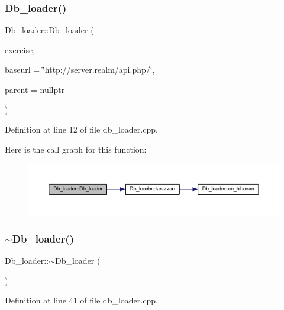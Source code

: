 \subsubsection{\texorpdfstring{Db\+\_\+loader()}{Db\_loader()}}
{\footnotesize\ttfamily Db\+\_\+loader\+::\+Db\+\_\+loader (\begin{DoxyParamCaption}\item[{Q\+Standard\+Item\+Model $\ast$}]{exercise,  }\item[{Q\+String const \&}]{baseurl = {\ttfamily \char`\"{}http\+://server.realm/api.php/\char`\"{}},  }\item[{Q\+Widget $\ast$}]{parent = {\ttfamily nullptr} }\end{DoxyParamCaption})\hspace{0.3cm}{\ttfamily [explicit]}}



Definition at line 12 of file db\+\_\+loader.\+cpp.

Here is the call graph for this function\+:\nopagebreak
\begin{figure}[H]
\begin{center}
\leavevmode
\includegraphics[width=350pt]{classDb__loader_a3a0062be83bea07369d7b6ab0fc77444_cgraph}
\end{center}
\end{figure}
\mbox{\label{classDb__loader_a4e14668e7c5243ad9369914343201003}} 
\subsubsection{\texorpdfstring{$\sim$\+Db\+\_\+loader()}{~Db\_loader()}}
{\footnotesize\ttfamily Db\+\_\+loader\+::$\sim$\+Db\+\_\+loader (\begin{DoxyParamCaption}{ }\end{DoxyParamCaption})}



Definition at line 41 of file db\+\_\+loader.\+cpp.



